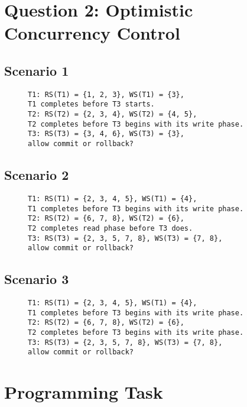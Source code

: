 \documentclass[12pt]{article}
\begin{document}
\section*{Question 2: Optimistic Concurrency Control}
\subsection*{Scenario 1}
\begin{figure}[h!]
\texttt{T1: RS(T1) = \{1, 2, 3\}, WS(T1) = \{3\},\\
T1 completes before T3 starts.\\
T2: RS(T2) = \{2, 3, 4\}, WS(T2) = \{4, 5\},\\
T2 completes before T3 begins with its write phase.\\
T3: RS(T3) = \{3, 4, 6\}, WS(T3) = \{3\},\\
allow commit or rollback?}
\end{figure}
\subsection*{Scenario 2}
\begin{figure}[h!]
\texttt{T1: RS(T1) = \{2, 3, 4, 5\}, WS(T1) = \{4\},\\
T1 completes before T3 begins with its write phase.\\
T2: RS(T2) = \{6, 7, 8\}, WS(T2) = \{6\},\\
T2 completes read phase before T3 does.\\
T3: RS(T3) = \{2, 3, 5, 7, 8\}, WS(T3) = \{7, 8\},\\
allow commit or rollback?}
\end{figure}
\subsection*{Scenario 3}
\begin{figure}[h!]
\texttt{T1: RS(T1) = \{2, 3, 4, 5\}, WS(T1) = \{4\},\\
T1 completes before T3 begins with its write phase.\\
T2: RS(T2) = \{6, 7, 8\}, WS(T2) = \{6\},\\
T2 completes before T3 begins with its write phase.\\
T3: RS(T3) = \{2, 3, 5, 7, 8\}, WS(T3) = \{7, 8\},\\
allow commit or rollback?}
\end{figure}
\section*{Programming Task}
\end{document}
